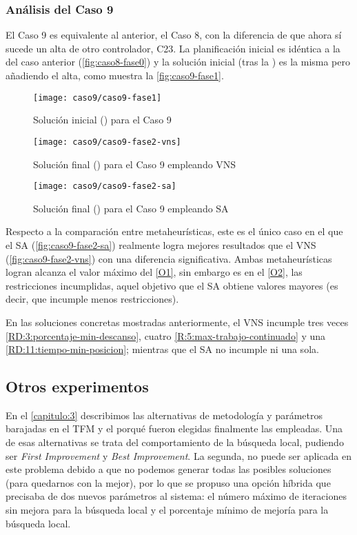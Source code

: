 \subsubsection{Análisis del Caso 9}

El Caso 9 es equivalente al anterior, el Caso 8, con la diferencia de que ahora sí sucede un alta de otro controlador, C23. La planificación inicial es idéntica a la del caso anterior (\autoref{fig:caso8-fase0}) y la solución inicial (tras la \faseuno{}) es la misma pero añadiendo el alta, como muestra la \autoref{fig:caso9-fase1}.

\begin{figure}[!]
	\centering
	\texttt{[image: caso9/caso9-fase1]}
	\caption{Solución inicial (\faseuno{}) para el Caso 9}
	\label{fig:caso9-fase1}
\end{figure}

\begin{figure}[!]
	\centering
	\texttt{[image: caso9/caso9-fase2-vns]}
	\caption{Solución final (\fasedos{}) para el Caso 9 empleando VNS}
	\label{fig:caso9-fase2-vns}
\end{figure}

\begin{figure}[!]
	\centering
	\texttt{[image: caso9/caso9-fase2-sa]}
	\caption{Solución final (\fasedos{}) para el Caso 9 empleando SA}
	\label{fig:caso9-fase2-sa}
\end{figure}

Respecto a la comparación entre metaheurísticas, este es el único caso en el que el SA (\autoref{fig:caso9-fase2-sa}) realmente logra mejores resultados que el VNS (\autoref{fig:caso9-fase2-vns}) con una diferencia significativa. Ambas metaheurísticas logran alcanza el valor máximo del \ref{O1}, sin embargo es en el \ref{O2}, las restricciones incumplidas, aquel objetivo que el SA obtiene valores mayores (es decir, que incumple menos restricciones).

En las soluciones concretas mostradas anteriormente, el VNS incumple tres veces \ref{RD:3:porcentaje-min-descanso}, cuatro \ref{R:5:max-trabajo-continuado} y una \ref{RD:11:tiempo-min-posicion}; mientras que el SA no incumple ni una sola.

\subsection{Otros experimentos}

En el \autoref{capitulo:3} describimos las alternativas de metodología y parámetros barajadas en el TFM y el porqué fueron elegidas finalmente las empleadas. Una de esas alternativas se trata del comportamiento de la búsqueda local, pudiendo ser \textit{First Improvement} y \textit{Best Improvement}. La segunda, no puede ser aplicada en este problema debido a que no podemos generar todas las posibles soluciones (para quedarnos con la mejor), por lo que se propuso una opción híbrida que precisaba de dos nuevos parámetros al sistema: el número máximo de iteraciones sin mejora para la búsqueda local y el porcentaje mínimo de mejoría para la búsqueda local.

